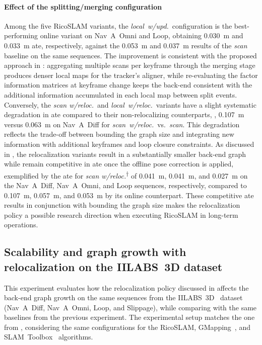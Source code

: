 \paragraph{Effect of the splitting/merging configuration}
Among the five RicoSLAM variants, the \emph{local~w/upd.}\ configuration is
the best-performing online variant on Nav~A~Omni and Loop, obtaining
\SI{0.030}{\metre} and \SI{0.033}{\metre} \gls{ate}, respectively, against
the \SI{0.053}{\metre} and \SI{0.037}{\metre} results of the \emph{scan}
baseline on the same sequences. The improvement is consistent with
the proposed approach in :
aggregating multiple scans per keyframe through the merging stage produces
denser local maps for the tracker's aligner, while re-evaluating the factor
information matrices at keyframe change keeps the back-end consistent with
the additional information accumulated in each local map between split events.
Conversely, the \emph{scan w/reloc.}\ and \emph{local~w/reloc.}\ variants
have a slight systematic degradation in \gls{ate} compared to their
non-relocalizing counterparts, \eg, \SI{0.107}{\metre} versus \SI{0.063}{\metre}
on Nav~A~Diff for \emph{scan~w/reloc.}\ vs.\ \emph{scan}. This degradation
reflects the trade-off between bounding the graph size and integrating new
information with additional keyframes and loop closure constraints.
As discussed in ,
the relocalization variants result in a substantially smaller back-end graph
while remain competitive in \gls{ate} once the offline pose correction is
applied, exemplified by the \gls{ate} for
\emph{scan w/reloc.}\textsuperscript{$\dagger$} of \SI{0.041}{\metre},
\SI{0.041}{\metre}, and \SI{0.027}{\metre} on the Nav~A~Diff, Nav~A~Omni, and
Loop sequences, respectively, compared to \SI{0.107}{\metre},
\SI{0.057}{\metre}, and \SI{0.053}{\metre} by its online counterpart.
These competitive \gls{ate} results in conjunction with bounding the graph size
makes the relocalization policy a possible research direction when executing
RicoSLAM in long-term operations.

\subsection{Scalability and graph growth with relocalization on the IILABS~3D dataset}
\label{sec:slam:results:relocalization}

This experiment evaluates how the relocalization policy discussed in
 affects the back-end graph growth on the
same sequences from the IILABS~3D~\cite{ribeiro:access:2025} dataset
(Nav~A~Diff, Nav~A~Omni, Loop, and Slippage), while comparing with
the same baselines from the previous experiment.
The experimental setup matches the one from
, considering the same configurations
for the RicoSLAM, GMapping~\cite{grisetti:tro:2007}, and
SLAM~Toolbox~\cite{macenski-jambrecic:joss:2021} algorithms.

